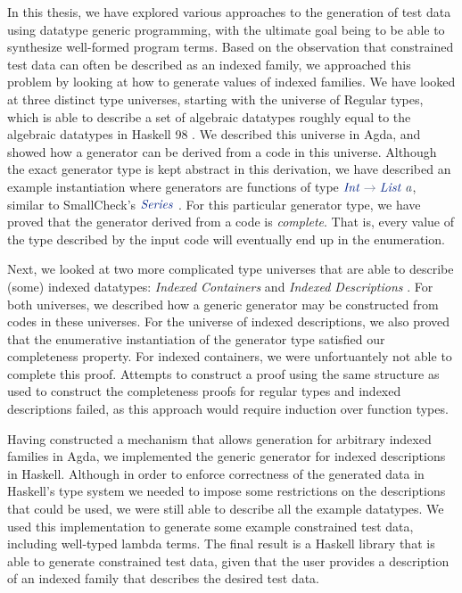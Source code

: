 \documentclass[a4paper,msc,twosized=semi]{uustthesis}
\let\oldemph\emph
\renewcommand\emph[1]{{\large\oldemph{#1}}}
\newcommand*{\mathcolor}{}
\def\mathcolor#1#{\mathcoloraux{#1}}
\newcommand*{\mathcoloraux}[3]{%
  \protect\leavevmode
  \begingroup
    \color#1{#2}#3%
  \endgroup
}
\newcommand{\HSSym}[1]{\mathcolor{hsblue4}{#1}}
\newcommand{\HSCon}[1]{\mathcolor{hsblue3}{\mathit{#1}}}
\newcommand{\HSVar}[1]{\mathcolor{hsblue5}{\mathit{#1}}}
\begin{document}
  In this thesis, we have explored various approaches to the generation of test data 
  using datatype generic programming, with the ultimate goal being to be able to 
  synthesize well-formed program terms. Based on the observation that constrained test 
  data can often be described as an indexed family, we approached this problem by 
  looking at how to generate values of indexed families. We have looked at three 
  distinct type universes, starting with the universe of Regular types, which is able 
  to describe a set of algebraic datatypes roughly equal to the algebraic datatypes in 
  Haskell 98 \cite{jones2003haskell}. We described this universe in Agda, and showed 
  how a generator can be derived from a code in this universe. Although the exact 
  generator type is kept abstract in this derivation, we have described an example 
  instantiation where generators are functions of type \ensuremath{\HSCon{Int}\HSSym{\to} \HSCon{List}\;\HSVar{a}}, similar to 
  SmallCheck's \ensuremath{\HSCon{Series}} \cite{runciman2008smallcheck}. For this particular generator 
  type, we have proved that the generator derived from a code is \emph{complete}. That 
  is, every value of the type described by the input code will eventually end up in 
  the enumeration. 

  Next, we looked at two more complicated type universes that are able to describe 
  (some) indexed datatypes: \emph{Indexed Containers} \cite{altenkirch2015indexed} and 
  \emph{Indexed Descriptions} \cite{dagand2013cosmology}. For both universes, we 
  described how a generic generator may be constructed from codes in these universes. 
  For the universe of indexed descriptions, we also proved that the enumerative 
  instantiation of the generator type satisfied our completeness property. For indexed 
  containers, we were unfortuantely not able to complete this proof. Attempts to 
  construct a proof using the same structure as used to construct the completeness 
  proofs for regular types and indexed descriptions failed, as this approach would 
  require induction over function types. 

  Having constructed a mechanism that allows generation for arbitrary indexed families 
  in Agda, we implemented the generic generator for indexed descriptions in Haskell. 
  Although in order to enforce correctness of the generated data in Haskell's type 
  system we needed to impose some restrictions on the descriptions that could be used, 
  we were still able to describe all the example datatypes. We used this 
  implementation to generate some example constrained test data, including well-typed 
  lambda terms. The final result is a Haskell library that is able to generate 
  constrained test data, given that the user provides a description of an indexed 
  family that describes the desired test data. 
\end{document}
